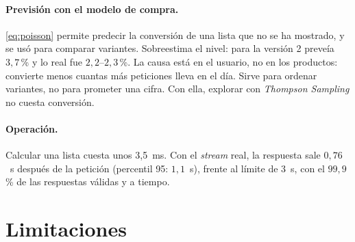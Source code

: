 \documentclass[11pt,a4paper]{article}
\begin{document}
\paragraph{Previsión con el modelo de compra.} \eqref{eq:poisson} permite predecir la conversión de una
lista que no se ha mostrado, y se usó para comparar variantes. Sobreestima el nivel: para la versión 2
preveía $3{,}7$\,\% y lo real fue $2{,}2$--$2{,}3$\,\%. La causa está en el usuario, no en los productos:
convierte menos cuantas más peticiones lleva en el día. Sirve para ordenar variantes, no para prometer
una cifra. Con ella, explorar con \emph{Thompson Sampling} no cuesta conversión.

\paragraph{Operación.} Calcular una lista cuesta unos 3{,}5~ms. Con el \emph{stream} real, la respuesta
sale $0{,}76$~s después de la petición (percentil 95: $1{,}1$~s), frente al límite de 3~s, con el
$99{,}9$\,\% de las respuestas válidas y a tiempo.

\section{Limitaciones}
\end{document}
